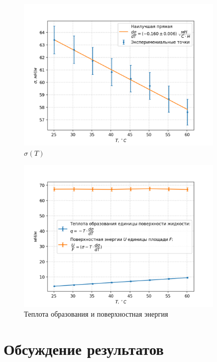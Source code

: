 \documentclass[a4paper,12pt]{article} %
\begin{document}
\begin{figure}[h!]
\begin{center}
\includegraphics[width=0.875\textwidth]{8.png}
\end{center}
\caption{$\sigma(T)$}\label{sigma(T)}
\end{figure}

\begin{figure}[h!]
\begin{center}
\includegraphics[width=0.875\textwidth]{9.png}
\end{center}
\caption{Теплота образования и поверхностная энергия}\label{W(T)}
\end{figure}

\section{Обсуждение результатов}
\end{document}
